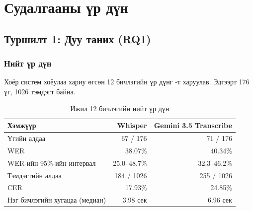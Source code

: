 \chapter{Судалгааны үр дүн}
\label{ch:results}


\section{Туршилт 1: Дуу таних (RQ1)}
\label{sec:res-stt-all}

\subsection{Нийт үр дүн}
\label{sec:res-stt}

Хоёр систем хоёулаа хариу өгсөн 12 бичлэгийн үр дүнг -т харуулав. Эдгээрт 176 үг, 1026 тэмдэгт байна.

\begin{table}[H]
\centering
\caption{Ижил 12 бичлэгийн нийт үр дүн}
\label{tab:stt_results}
\begin{tabular}{|l|r|r|}
\hline
\textbf{Хэмжүүр} & \textbf{Whisper} & \textbf{Gemini 3.5 Transcribe} \\
\hline
Үгийн алдаа & 67 / 176 & 71 / 176 \\
WER & 38.07\% & 40.34\% \\
WER-ийн 95\%-ийн интервал & 25.0--48.7\% & 32.3--46.2\% \\
\hline
Тэмдэгтийн алдаа & 184 / 1026 & 255 / 1026 \\
CER & 17.93\% & 24.85\% \\
\hline
Нэг бичлэгийн хугацаа (медиан) & 3.98 сек & 6.96 сек \\
\hline
\end{tabular}
\end{table}

